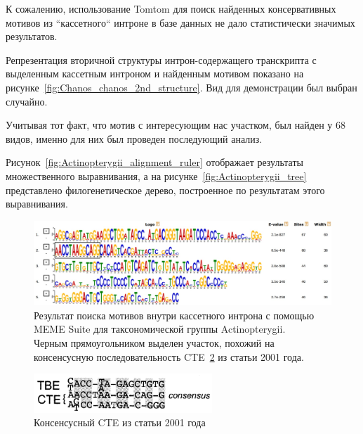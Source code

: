 К сожалению, использование Tomtom для поиск найденных консервативных мотивов из ``кассетного`` интроне в базе данных не дало статистически значимых результатов.

Репрезентация вторичной структуры интрон-содержащего транскрипта с выделенным кассетным интроном и найденным мотивом показано на рисунке~\ref{fig:Chanos_chanos_2nd_structure}.
Вид для демонстрации был выбран случайно.

Учитывая тот факт, что мотив с интересующим нас участком, был найден у 68 видов, именно для них был проведен последующий анализ.

Рисунок~\ref{fig:Actinopterygii_alignment_ruler} отображает результаты множественного выравнивания, а на рисунке~\ref{fig:Actinopterygii_tree} представлено филогенетическое дерево, построенное по результатам этого выравнивания.

\begin{figure}[h] %
    \centering
    \includegraphics[width=1.0\textwidth]{images/Actinopterygii_meme_motif}
    \caption{Результат поиска мотивов внутри кассетного интрона с помощью MEME Suite для таксономической группы Actinopterygii.\\
    Черным прямоугольником выделен участок, похожий на консенсусную последовательность CTE~\ref{fig:CTE_consensus} из статьи 2001 года.}
    \label{fig:Actinopterygii_meme}
\end{figure}

\begin{figure}[h] %
    \centering
    \includegraphics[width=0.6\textwidth]{images/CTE_consensus}
    \caption{Консенсусный CTE из статьи 2001 года}
    \label{fig:CTE_consensus}
\end{figure}

